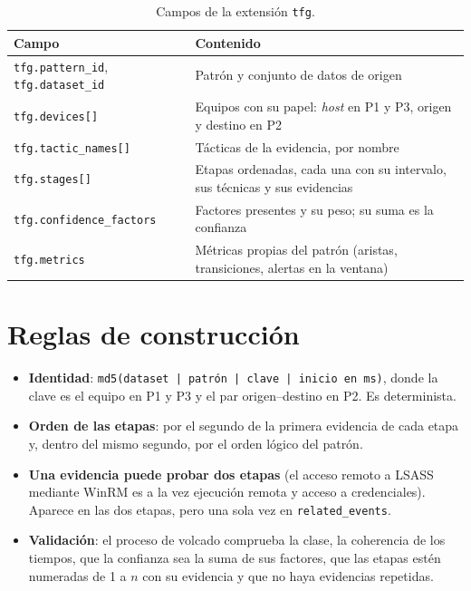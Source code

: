 \begin{table}[H]
\centering
\small
\begin{tabular}{|l|p{9cm}|}
\hline
\textbf{Campo} & \textbf{Contenido} \\
\hline
\texttt{tfg.pattern\_id}, \texttt{tfg.dataset\_id} & Patrón y conjunto de datos de origen \\
\texttt{tfg.devices[]} & Equipos con su papel: \textit{host} en P1 y P3, origen y destino en P2 \\
\texttt{tfg.tactic\_names[]} & Tácticas de la evidencia, por nombre \\
\texttt{tfg.stages[]} & Etapas ordenadas, cada una con su intervalo, sus técnicas y sus evidencias \\
\texttt{tfg.confidence\_factors} & Factores presentes y su peso; su suma es la confianza \\
\texttt{tfg.metrics} & Métricas propias del patrón (aristas, transiciones, alertas en la ventana) \\
\hline
\end{tabular}
\caption{Campos de la extensión \texttt{tfg}.}
\end{table}

\section{Reglas de construcción}

\begin{itemize}
    \item \textbf{Identidad}: \texttt{md5(dataset | patrón | clave | inicio en ms)}, donde la
    clave es el equipo en P1 y P3 y el par origen--destino en P2. Es determinista.
    \item \textbf{Orden de las etapas}: por el segundo de la primera evidencia de cada etapa y,
    dentro del mismo segundo, por el orden lógico del patrón.
    \item \textbf{Una evidencia puede probar dos etapas} (el acceso remoto a LSASS mediante
    WinRM es a la vez ejecución remota y acceso a credenciales). Aparece en las dos etapas,
    pero una sola vez en \texttt{related\_events}.
    \item \textbf{Validación}: el proceso de volcado comprueba la clase, la coherencia de los
    tiempos, que la confianza sea la suma de sus factores, que las etapas estén numeradas de 1
    a $n$ con su evidencia y que no haya evidencias repetidas.
\end{itemize}

